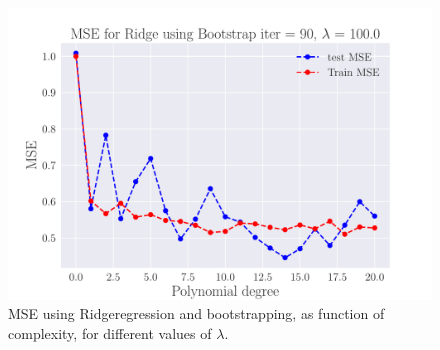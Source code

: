 \documentclass[reprint,english,notitlepage,aps,nobalancelastpage,nofootinbib]{revtex4-1}  %
\begin{document}
\begin{figure}[H]
	\endminipage\hfill
	\includegraphics[width=\linewidth]{MSE_Ridge_n30_eps02_pol20_Bootstrap_re90_lam_100_0.pdf}
	\endminipage
	\caption{MSE using Ridgeregression and bootstrapping, as function of complexity, for different values of $\lambda$.} \label{fig:Ridge_boot_PM}
\end{figure}
\end{document}

